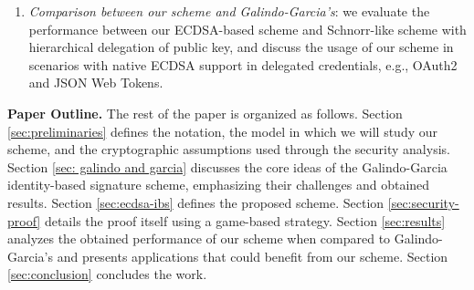 \documentclass[version=submission, floatrow]{iacrcc}
\begin{document}
\begin{enumerate}[label={\emph{\roman*})}]
\begin{figure}[H]
    \centering
    \caption{Summary of the security proof under \textsc{GenDSA}'s framework. The dashed line represents an equivalent result.}
    \label{fig: contributions}
\end{figure}

\item \emph{Comparison between our scheme and Galindo-Garcia's}: we evaluate the performance between our ECDSA-based scheme and Schnorr-like scheme with hierarchical delegation of public key, and discuss the usage of our scheme in scenarios with native ECDSA support in delegated credentials, e.g., OAuth2 and JSON Web Tokens.
\end{enumerate}

\noindent\textbf{Paper Outline.} The rest of the paper is organized as follows. 
%
Section \ref{sec:preliminaries} defines the notation, the model in which we will study our scheme, and the cryptographic assumptions used through the security analysis.
%
Section \ref{sec: galindo and garcia} discusses the core ideas of the Galindo-Garcia identity-based signature scheme, emphasizing their challenges and obtained results.
%
Section \ref{sec:ecdsa-ibs} defines the proposed scheme.
%
Section \ref{sec:security-proof} details the proof itself using a game-based strategy.
%
Section \ref{sec:results} analyzes the obtained performance of our scheme when compared to Galindo-Garcia's and presents applications that could benefit from our scheme. 
%
Section \ref{sec:conclusion} concludes the work.
\end{document}
